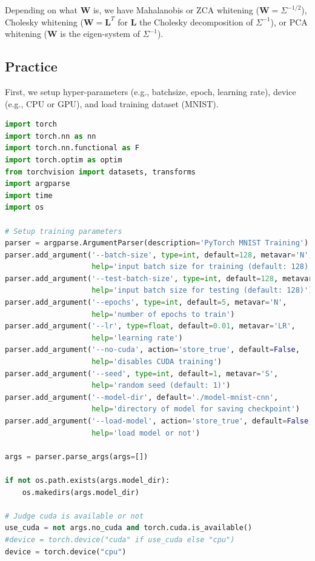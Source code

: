 Depending on what $\textbf{W}$ is, we have Mahalanobis or ZCA whitening ($\textbf{W}=\Sigma^{-1/2}$), Cholesky whitening ($\textbf{W}=\textbf{L}^T$ for $\textbf{L}$ the  Cholesky decomposition of $\Sigma^{-1}$), or PCA whitening ($\textbf{W}$ is the eigen-system of $\Sigma^{-1}$).  

\subsection{Practice}


First, we setup hyper-parameters (e.g., batchsize, epoch, learning rate), device (e.g., CPU or GPU), and load training dataset (MNIST).
\begin{lstlisting}[language=Python]
import torch
import torch.nn as nn
import torch.nn.functional as F
import torch.optim as optim
from torchvision import datasets, transforms
import argparse
import time
import os

# Setup training parameters
parser = argparse.ArgumentParser(description='PyTorch MNIST Training')
parser.add_argument('--batch-size', type=int, default=128, metavar='N',
                    help='input batch size for training (default: 128)')
parser.add_argument('--test-batch-size', type=int, default=128, metavar='N',
                    help='input batch size for testing (default: 128)')
parser.add_argument('--epochs', type=int, default=5, metavar='N',
                    help='number of epochs to train')
parser.add_argument('--lr', type=float, default=0.01, metavar='LR',
                    help='learning rate')
parser.add_argument('--no-cuda', action='store_true', default=False,
                    help='disables CUDA training')
parser.add_argument('--seed', type=int, default=1, metavar='S',
                    help='random seed (default: 1)')
parser.add_argument('--model-dir', default='./model-mnist-cnn',
                    help='directory of model for saving checkpoint')
parser.add_argument('--load-model', action='store_true', default=False,
                    help='load model or not')

args = parser.parse_args(args=[]) 

if not os.path.exists(args.model_dir):
    os.makedirs(args.model_dir)
        
# Judge cuda is available or not
use_cuda = not args.no_cuda and torch.cuda.is_available()
#device = torch.device("cuda" if use_cuda else "cpu")
device = torch.device("cpu")


\end{lstlisting}
